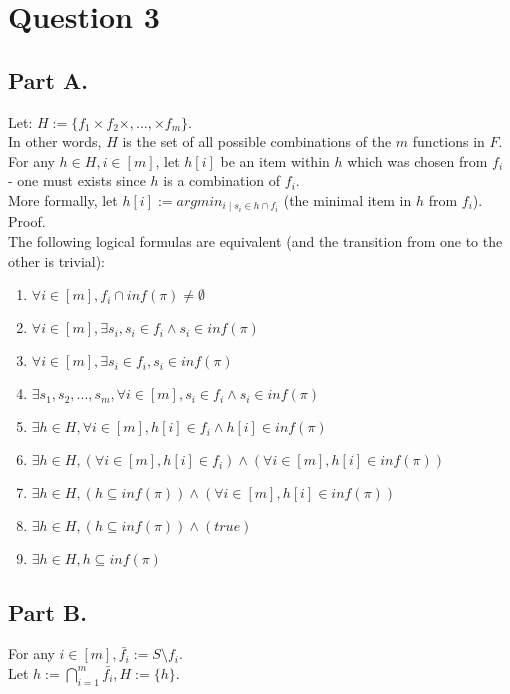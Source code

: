 \documentclass{article}
\begin{document}
\section*{Question 3}
\subsection*{Part A.}
Let: $H:=\{f_1\times f_2\times, ...,\times f_m\}$.\\
In other words, $H$ is the set of all possible combinations of the $m$ functions in $F$.\\
For any $h\in H, i\in[m]$, let $h[i]$ be an item within $h$
which was chosen from $f_i$ - one must exists since $h$ is a combination of $f_i$.\\
More formally, let $h[i]:= argmin_{i\mid s_i\in h\cap f_i}$ (the minimal item in $h$ from $f_i$).\\

Proof.\\
The following logical formulas are equivalent (and the transition from one to the other is trivial):
\begin{enumerate}
    \item $\forall i\in[m], f_i\cap inf(\pi)\neq\emptyset$
    \item $\forall i\in[m],\exists s_i, s_i\in f_i\wedge s_i\in inf(\pi)$
    \item $\forall i\in[m],\exists s_i\in f_i, s_i\in inf(\pi)$
    \item $\exists s_1,s_2,...,s_m,\forall i\in[m], s_i\in f_i\wedge s_i\in inf(\pi)$
    \item $\exists h\in H,\forall i\in[m], h[i]\in f_i\wedge h[i]\in inf(\pi)$
    \item $\exists h\in H,(\forall i\in[m], h[i]\in f_i)\wedge (\forall i\in[m], h[i]\in inf(\pi))$
    \item $\exists h\in H,(h\subseteq inf(\pi))\wedge (\forall i\in[m], h[i]\in inf(\pi))$
    \item $\exists h\in H,(h\subseteq inf(\pi))\wedge (true)$
    \item $\exists h\in H, h\subseteq inf(\pi)$
\end{enumerate}

\subsection*{Part B.}
For any $i\in[m], \bar{f_i}:=S\setminus f_i$.\\
Let $h:=\bigcap_{i=1}^m\bar{f_i}, H:=\{h\}$.\\
\end{document}
